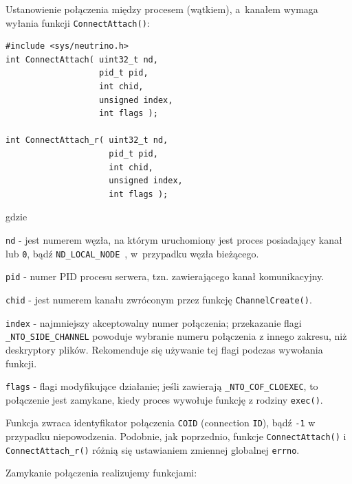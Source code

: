 Ustanowienie połączenia między procesem (wątkiem), a~kanałem wymaga wyłania funkcji \lstinline[style=MyCStyle]{ConnectAttach()}: 

 
\begin{lstlisting}[style=MyCStyle]
#include <sys/neutrino.h>
int ConnectAttach( uint32_t nd,
                   pid_t pid,
                   int chid,
                   unsigned index,
                   int flags );

int ConnectAttach_r( uint32_t nd,
                     pid_t pid,
                     int chid,
                     unsigned index,
                     int flags );
\end{lstlisting}

gdzie 

\begin{myitemize}
\item[] \lstinline[style=MyCStyle]{nd} - jest numerem węzła, na którym uruchomiony jest proces posiadający kanał lub \lstinline[style=MyCStyle]{0}, bądź \lstinline[style=MyCStyle]{ND_LOCAL_NODE}~, w~przypadku węzła bieżącego.
\item[] \lstinline[style=MyCStyle]{pid} - numer PID procesu serwera, tzn. zawierającego kanał komunikacyjny.
\item[] \lstinline[style=MyCStyle]{chid} - jest numerem kanału zwróconym przez funkcję \lstinline[style=MyCStyle]{ChannelCreate()}.
\item[] \lstinline[style=MyCStyle]{index} - najmniejszy akceptowalny numer połączenia; przekazanie flagi \lstinline[style=MyCStyle]{_NTO_SIDE_CHANNEL} powoduje wybranie numeru połączenia z innego zakresu, niż deskryptory plików. Rekomenduje się używanie tej flagi podczas wywołania funkcji. 
\item[] \lstinline[style=MyCStyle]{flags} - flagi modyfikujące działanie; jeśli zawierają \lstinline[style=MyCStyle]{_NTO_COF_CLOEXEC}, to połączenie jest zamykane, kiedy proces wywołuje funkcję z rodziny \lstinline[style=MyCStyle]{exec()}. 
\end{myitemize}

Funkcja zwraca identyfikator połączenia \lstinline[style=MyCStyle]{COID} (connection \lstinline[style=MyCStyle]{ID}), bądź \lstinline[style=MyCStyle]{-1} w przypadku niepowodzenia. Podobnie, jak poprzednio, funkcje \lstinline[style=MyCStyle]{ConnectAttach()} i \lstinline[style=MyCStyle]{ConnectAttach_r()} różnią się ustawianiem zmiennej globalnej \lstinline[style=MyCStyle]{errno}.
 
Zamykanie połączenia realizujemy funkcjami: 

